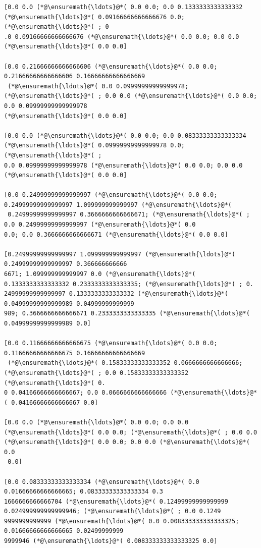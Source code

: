 \documentclass[12pt,a4paper]{article}
\begin{document}
\begin{lstlisting}
[0.0 0.0 (*@\ensuremath{\ldots}@*( 0.0 0.0; 0.0 0.1333333333333332 (*@\ensuremath{\ldots}@*( 0.09166666666666676 0.0; (*@\ensuremath{\ldots}@*( ; 0
.0 0.09166666666666676 (*@\ensuremath{\ldots}@*( 0.0 0.0; 0.0 0.0 (*@\ensuremath{\ldots}@*( 0.0 0.0]

[0.0 0.21666666666666606 (*@\ensuremath{\ldots}@*( 0.0 0.0; 0.21666666666666606 0.16666666666666669
 (*@\ensuremath{\ldots}@*( 0.0 0.09999999999999978; (*@\ensuremath{\ldots}@*( ; 0.0 0.0 (*@\ensuremath{\ldots}@*( 0.0 0.0; 0.0 0.09999999999999978 
(*@\ensuremath{\ldots}@*( 0.0 0.0]

[0.0 0.0 (*@\ensuremath{\ldots}@*( 0.0 0.0; 0.0 0.08333333333333334 (*@\ensuremath{\ldots}@*( 0.09999999999999978 0.0; (*@\ensuremath{\ldots}@*( ; 
0.0 0.09999999999999978 (*@\ensuremath{\ldots}@*( 0.0 0.0; 0.0 0.0 (*@\ensuremath{\ldots}@*( 0.0 0.0]

[0.0 0.24999999999999997 (*@\ensuremath{\ldots}@*( 0.0 0.0; 0.24999999999999997 1.099999999999997 (*@\ensuremath{\ldots}@*(
 0.24999999999999997 0.3666666666666671; (*@\ensuremath{\ldots}@*( ; 0.0 0.24999999999999997 (*@\ensuremath{\ldots}@*( 0.0 
0.0; 0.0 0.3666666666666671 (*@\ensuremath{\ldots}@*( 0.0 0.0]

[0.24999999999999997 1.099999999999997 (*@\ensuremath{\ldots}@*( 0.24999999999999997 0.366666666666
6671; 1.099999999999997 0.0 (*@\ensuremath{\ldots}@*( 0.1333333333333332 0.2333333333333335; (*@\ensuremath{\ldots}@*( ; 0.
24999999999999997 0.1333333333333332 (*@\ensuremath{\ldots}@*( 0.04999999999999989 0.04999999999999
989; 0.3666666666666671 0.2333333333333335 (*@\ensuremath{\ldots}@*( 0.04999999999999989 0.0]

[0.0 0.11666666666666675 (*@\ensuremath{\ldots}@*( 0.0 0.0; 0.11666666666666675 0.16666666666666669
 (*@\ensuremath{\ldots}@*( 0.15833333333333352 0.0666666666666666; (*@\ensuremath{\ldots}@*( ; 0.0 0.15833333333333352 (*@\ensuremath{\ldots}@*( 0.
0 0.04166666666666667; 0.0 0.0666666666666666 (*@\ensuremath{\ldots}@*( 0.04166666666666667 0.0]

[0.0 0.0 (*@\ensuremath{\ldots}@*( 0.0 0.0; 0.0 0.0 (*@\ensuremath{\ldots}@*( 0.0 0.0; (*@\ensuremath{\ldots}@*( ; 0.0 0.0 (*@\ensuremath{\ldots}@*( 0.0 0.0; 0.0 0.0 (*@\ensuremath{\ldots}@*( 0.0
 0.0]

[0.0 0.08333333333333334 (*@\ensuremath{\ldots}@*( 0.0 0.01666666666666665; 0.08333333333333334 0.3
1666666666666704 (*@\ensuremath{\ldots}@*( 0.12499999999999999 0.024999999999999946; (*@\ensuremath{\ldots}@*( ; 0.0 0.1249
9999999999999 (*@\ensuremath{\ldots}@*( 0.0 0.008333333333333325; 0.01666666666666665 0.02499999999
9999946 (*@\ensuremath{\ldots}@*( 0.008333333333333325 0.0]


\end{lstlisting}
\end{document}
